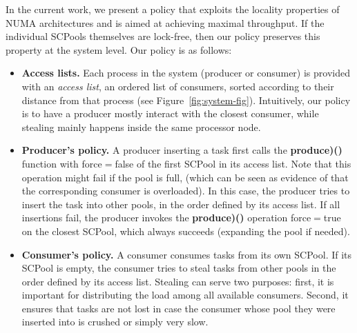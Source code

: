 In the current work, we present a policy that exploits the locality properties of NUMA architectures and is aimed at achieving maximal throughput. If the individual SCPools themselves are lock-free, then our policy preserves this property at the system level. Our policy is as follows:
\begin{itemize}
	\item {\bf Access lists.} Each process in the system (producer or consumer) is provided with an \emph{access list}, an ordered list of consumers, sorted according to their distance from that process (see Figure~\ref{fig:system-fig}). Intuitively, our policy is to have a producer mostly interact with the closest consumer, while stealing mainly happens inside the same processor node. 
	\item {\bf Producer's policy.} A producer inserting a task first calls the {\bf produce)()} function with force$=$false of the first SCPool in its access list. Note that this operation might fail if the pool is full, (which can be seen as evidence of that the corresponding consumer is overloaded).  In this case, the producer tries to insert the task into other pools, in the order defined by its access list. If all insertions fail, the producer invokes the {\bf produce)()} operation force$=$true on the closest SCPool, which always succeeds (expanding the pool if needed). 
	\item {\bf Consumer's policy.} A consumer consumes tasks from its own SCPool. If its SCPool is empty, the consumer tries to steal tasks from other pools in the order defined by its access list. Stealing can serve two purposes: first, it is important for distributing the load among all available consumers. Second, it ensures that tasks are not lost in case the consumer whose pool they were inserted into is crushed or simply very slow.
\end{itemize}





